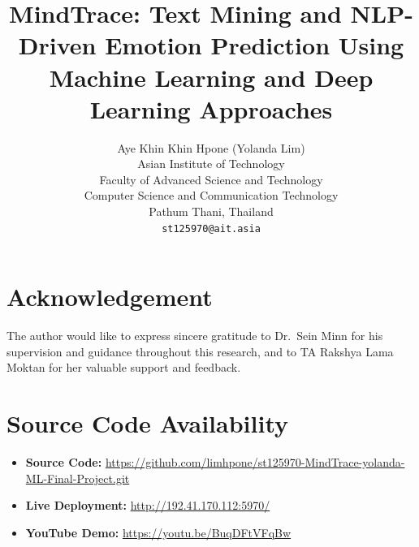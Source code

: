 \documentclass[10pt,twocolumn,letterpaper]{article}
\title{MindTrace: Text Mining and NLP-Driven Emotion Prediction Using Machine Learning and Deep Learning Approaches}
\author{Aye Khin Khin Hpone (Yolanda Lim)\\
Asian Institute of Technology\\
Faculty of Advanced Science and Technology\\
Computer Science and Communication Technology\\
Pathum Thani, Thailand\\
{\tt\small st125970@ait.asia}
}
\begin{document}


\maketitle









\section*{Acknowledgement}
The author would like to express sincere gratitude to Dr.\ Sein Minn for his supervision and guidance throughout this research, and to TA Rakshya Lama Moktan for her valuable support and feedback.

\section*{Source Code Availability}
\begin{itemize}[nosep]
    \item \textbf{Source Code:} \url{https://github.com/limhpone/st125970-MindTrace-yolanda-ML-Final-Project.git}
    \item \textbf{Live Deployment:} \url{http://192.41.170.112:5970/}
    \item \textbf{YouTube Demo:} \url{https://youtu.be/BuqDFtVFqBw}
\end{itemize}

{
    \small
    
    
}
\end{document}
